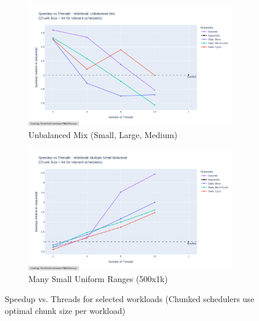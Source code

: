 \documentclass[10pt]{article}
\begin{document}
\begin{figure}[H]
    \begin{subfigure}[b]{0.49\textwidth}
        \centering
        \includegraphics[width=\textwidth]{../results/plots/speedup_vs_threads/speedup_vs_threads_W2.pdf}
        \caption{Unbalanced Mix (Small, Large, Medium)}
        \label{fig:speedup_unbalanced_mix}
    \end{subfigure}
    \hfill
    \begin{subfigure}[b]{0.49\textwidth}
        \centering
        \includegraphics[width=\textwidth]{../results/plots/speedup_vs_threads/speedup_vs_threads_W3.pdf}
        \caption{Many Small Uniform Ranges (500x1k)}
        \label{fig:speedup_many_small}
    \end{subfigure}

    \caption{Speedup vs. Threads for selected workloads (Chunked schedulers use optimal chunk size per workload)}
    \label{fig:speedup_comparison_grid}
\end{figure}
\end{document}
